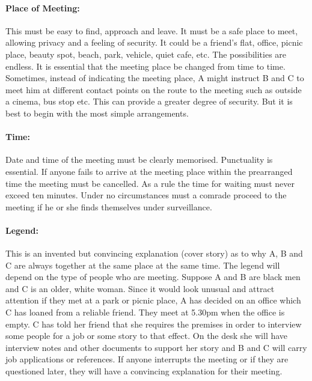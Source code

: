 \paragraph{Place of Meeting:}

This must be easy to find, approach and leave. It must be a safe place
to meet, allowing privacy and a feeling of security. It could be a
friend's flat, office, picnic place, beauty spot, beach, park, vehicle,
quiet cafe, etc. The possibilities are endless. It is essential that the
meeting place be changed from time to time. Sometimes, instead of
indicating the meeting place, A might instruct B and C to meet him at
different contact points on the route to the meeting such as outside a
cinema, bus stop etc. This can provide a greater degree of security. But
it is best to begin with the most simple arrangements.

\paragraph{Time:}

Date and time of the meeting must be clearly memorised. Punctuality is
essential. If anyone fails to arrive at the meeting place within the
prearranged time the meeting must be cancelled. As a rule the time for
waiting must never exceed ten minutes. Under no circumstances must a
comrade proceed to the meeting if he or she finds themselves under
surveillance.

\paragraph{Legend:}

This is an invented but convincing explanation (cover story) as to why
A, B and C are always together at the same place at the same time. The
legend will depend on the type of people who are meeting. Suppose A and
B are black men and C is an older, white woman. Since it would look
unusual and attract attention if they met at a park or picnic place, A
has decided on an office which C has loaned from a reliable friend. They
meet at 5.30pm when the office is empty. C has told her friend that she
requires the premises in order to interview some people for a job or
some story to that effect. On the desk she will have interview notes and
other documents to support her story and B and C will carry job
applications or references. If anyone interrupts the meeting or if they
are questioned later, they will have a convincing explanation for their
meeting.

